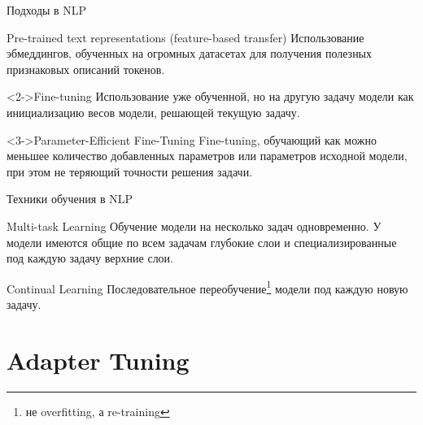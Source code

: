 \documentclass[9pt]{beamer}
\begin{document}
\begin{frame}{Подходы в NLP}

    \begin{block}{Pre-trained text representations (feature-based transfer)}
        Использование эбмеддингов, обученных на огромных датасетах для получения полезных признаковых описаний токенов.
    \end{block}

    \begin{block}<2->{Fine-tuning}
        Использование уже обученной, но на другую задачу модели как инициализацию весов модели, решающей текущую задачу.
    \end{block}

    \begin{block}<3->{Parameter-Efficient Fine-Tuning}
        Fine-tuning, обучающий как можно меньшее количество добавленных параметров или параметров исходной модели, при этом не теряющий точности решения задачи.
    \end{block}

\end{frame}

\begin{frame}{Техники обучения в NLP}

    \begin{block}{Multi-task Learning}
        Обучение модели на несколько задач одновременно. У модели имеются общие по всем задачам глубокие слои и специализированные под каждую задачу верхние слои.
    \end{block}

    \begin{block}{Continual Learning}
        Последовательное переобучение\footnote{не overfitting, а re-training} модели под каждую новую задачу.
    \end{block}

\end{frame}


\section{Adapter Tuning}
\end{document}
